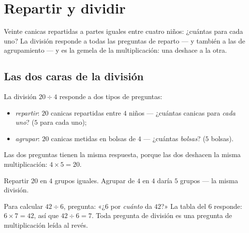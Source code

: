 \chapter{Repartir y dividir}\label{ch:g3:division}

Veinte canicas repartidas a partes iguales entre cuatro niños: ¿cuántas para cada uno?
La división responde a todas las preguntas de reparto --- y también a las de
agrupamiento --- y es la gemela de la multiplicación: una deshace
a la otra.

\section{Las dos caras de la división}

\begin{definition}[La división]\label{def:g3:division:def}
La división $20 \div 4$ responde a dos tipos de preguntas:
\begin{itemize}
  \item \emph{repartir}: $20$ canicas repartidas entre $4$ niños ---
        ¿cuántas canicas para \emph{cada uno}? ($5$ para cada uno);
  \item \emph{agrupar}: $20$ canicas metidas en bolsas de $4$ --- ¿cuántas
        \emph{bolsas}? ($5$ bolsas).
\end{itemize}
Las dos preguntas tienen la misma respuesta, porque las dos deshacen la misma
multiplicación: $4 \times 5 = 20$.
\end{definition}

\begin{omfigure}

{\small Repartir $20$ en $4$ grupos iguales. Agrupar de $4$ en $4$
daría $5$ grupos --- la misma división.}
\end{omfigure}

\begin{method}\label{met:g3:division:tables}
Para calcular $42 \div 6$, pregunta: «¿$6$ por \emph{cuánto} da $42$?»
La tabla del $6$ responde: $6 \times 7 = 42$, así que $42 \div 6 = 7$.
Toda pregunta de división es una pregunta de multiplicación leída
al revés.
\end{method}

